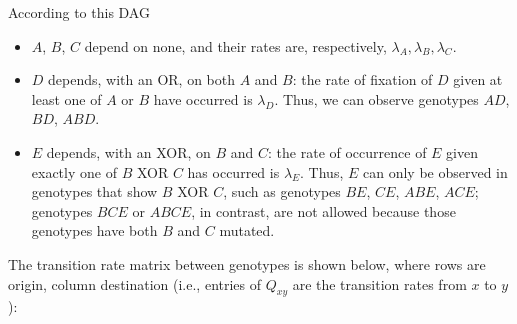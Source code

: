 \documentclass[a4paper,11pt]{article}
\begin{document}
According to this DAG
\begin{itemize}
 \item $A$, $B$, $C$ depend on none, and their rates are, respectively, $\lambda_A, \lambda_B, \lambda_C$.
 \item $D$ depends, with an OR, on both $A$ and $B$: the rate of fixation of $D$ given at least one of $A$ or $B$ have occurred is $\lambda_D$. Thus, we can observe genotypes $AD$, $BD$, $ABD$.
 \item $E$ depends, with an XOR, on $B$ and $C$: the rate of occurrence of $E$ given exactly one of $B$ XOR $C$ has occurred is $\lambda_E$. Thus, $E$ can only be observed in genotypes that show $B$ XOR $C$, such as genotypes $BE$, $CE$, $ABE$, $ACE$; genotypes $BCE$ or $ABCE$, in contrast, are not allowed because those genotypes have both $B$ and $C$ mutated. \end{itemize}

The transition rate matrix between genotypes is shown below, where rows are origin, column destination (i.e., entries of $Q_{xy}$ are the transition rates from $x$ to $y$):
\end{document}
